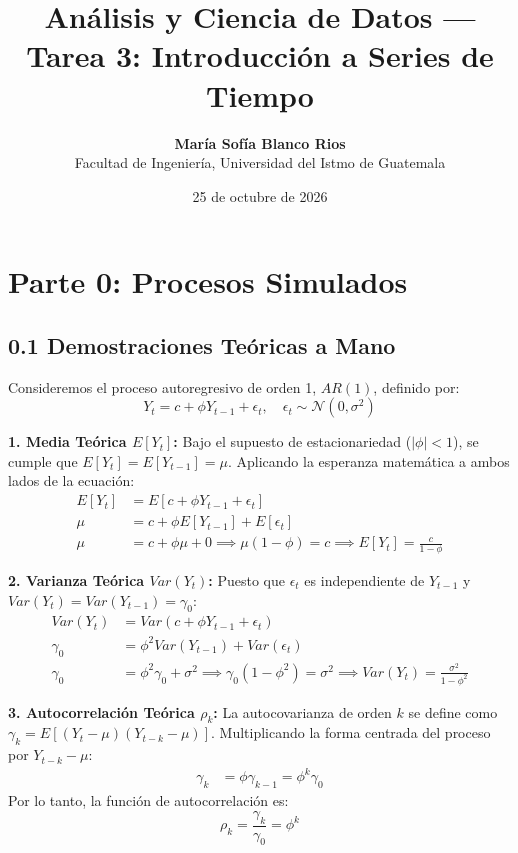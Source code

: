 \documentclass[11pt,a4paper]{article}
\title{\textbf{Análisis y Ciencia de Datos — Tarea 3: Introducción a Series de Tiempo}}
\author{\textbf{María Sofía Blanco Rios} \\ Facultad de Ingeniería, Universidad del Istmo de Guatemala}
\date{25 de octubre de 2026}
\begin{document}
\maketitle

\section{Parte 0: Procesos Simulados}

\subsection{0.1 Demostraciones Teóricas a Mano}

Consideremos el proceso autoregresivo de orden 1, $AR(1)$, definido por:
\begin{equation}
Y_{t} = c + \phi Y_{t-1} + \epsilon_{t}, \quad \epsilon_{t} \sim \mathcal{N}(0, \sigma^2)
\end{equation}

\textbf{1. Media Teórica $E[Y_t]$:}
Bajo el supuesto de estacionariedad ($|\phi| < 1$), se cumple que $E[Y_t] = E[Y_{t-1}] = \mu$. Aplicando la esperanza matemática a ambos lados de la ecuación:
\begin{align*}
E[Y_t] &= E[c + \phi Y_{t-1} + \epsilon_t] \\
\mu &= c + \phi E[Y_{t-1}] + E[\epsilon_t] \\
\mu &= c + \phi \mu + 0 \implies \mu(1 - \phi) = c \implies E[Y_t] = \frac{c}{1 - \phi}
\end{align*}

\textbf{2. Varianza Teórica $Var(Y_t)$:}
Puesto que $\epsilon_t$ es independiente de $Y_{t-1}$ y $Var(Y_t) = Var(Y_{t-1}) = \gamma_0$:
\begin{align*}
Var(Y_t) &= Var(c + \phi Y_{t-1} + \epsilon_t) \\
\gamma_0 &= \phi^2 Var(Y_{t-1}) + Var(\epsilon_t) \\
\gamma_0 &= \phi^2 \gamma_0 + \sigma^2 \implies \gamma_0(1 - \phi^2) = \sigma^2 \implies Var(Y_t) = \frac{\sigma^2}{1 - \phi^2}
\end{align*}

\textbf{3. Autocorrelación Teórica $\rho_k$:}
La autocovarianza de orden $k$ se define como $\gamma_k = E[(Y_t - \mu)(Y_{t-k} - \mu)]$. Multiplicando la forma centrada del proceso por $Y_{t-k} - \mu$:
\begin{align*}
\gamma_k &= \phi \gamma_{k-1} = \phi^k \gamma_0
\end{align*}
Por lo tanto, la función de autocorrelación es:
\begin{equation*}
\rho_k = \frac{\gamma_k}{\gamma_0} = \phi^k
\end{equation*}
\end{document}
